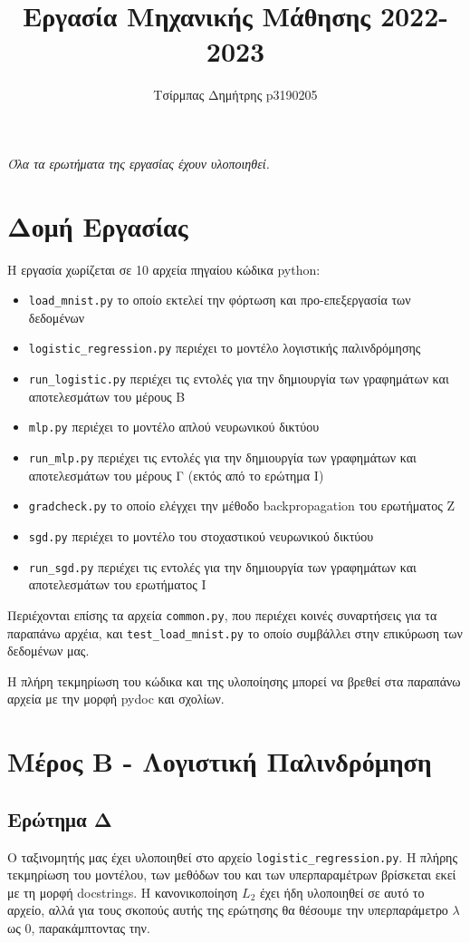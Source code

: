 \documentclass{article}
\title{Εργασία Μηχανικής Μάθησης 2022-2023}
\author{Τσίρμπας Δημήτρης p3190205}
\newcommand{\code}{\texttt}
\begin{document}
	
\maketitle

\begin{center}
	\textit{Όλα τα ερωτήματα της εργασίας έχουν υλοποιηθεί.}
\end{center}

\section{Δομή Εργασίας}
Η εργασία χωρίζεται σε 10 αρχεία πηγαίου κώδικα python:
\begin{itemize}
	\item \code{load\_mnist.py} το οποίο εκτελεί την φόρτωση και προ-επεξεργασία των δεδομένων 
	\item \code{logistic\_regression.py} περιέχει το μοντέλο λογιστικής παλινδρόμησης
	\item \code{run\_logistic.py} περιέχει τις εντολές για την δημιουργία των γραφημάτων και αποτελεσμάτων του μέρους Β
	\item \code{mlp.py} περιέχει το μοντέλο απλού νευρωνικού δικτύου 
	\item \code{run\_mlp.py} περιέχει τις εντολές για την δημιουργία των γραφημάτων και αποτελεσμάτων του μέρους Γ (εκτός από το ερώτημα I)
	\item \code{gradcheck.py} το οποίο ελέγχει την μέθοδο backpropagation του ερωτήματος Ζ
	\item \code{sgd.py} περιέχει το μοντέλο του στοχαστικού νευρωνικού δικτύου 
	\item \code{run\_sgd.py}  περιέχει τις εντολές για την δημιουργία των γραφημάτων και αποτελεσμάτων του ερωτήματος I
\end{itemize}

Περιέχονται επίσης τα αρχεία \code{common.py}, που περιέχει κοινές συναρτήσεις για τα παραπάνω αρχέια, και \code{test\_load\_mnist.py} το οποίο συμβάλλει στην επικύρωση των δεδομένων μας.

Η πλήρη τεκμηρίωση του κώδικα και της υλοποίησης μπορεί να βρεθεί στα παραπάνω αρχεία με την μορφή pydoc και σχολίων.


\section{Μέρος Β - Λογιστική Παλινδρόμηση}

\subsection{Ερώτημα Δ}
Ο ταξινομητής μας έχει υλοποιηθεί στο αρχείο \code{logistic\_regression.py}. Η πλήρης τεκμηρίωση του μοντέλου, των μεθόδων του και των υπερπαραμέτρων βρίσκεται εκεί με τη μορφή docstrings. Η κανονικοποίηση $L_{2}$ έχει ήδη υλοποιηθεί σε αυτό το αρχείο, αλλά για τους σκοπούς αυτής της ερώτησης θα θέσουμε την υπερπαράμετρο \code{$\lambda$} ως 0, παρακάμπτοντας την.\par
\end{document}
